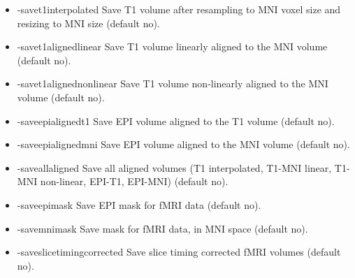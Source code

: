 \begin{itemize}

\item -savet1interpolated        
\newline \newline Save T1 volume after resampling to MNI voxel size and resizing to MNI size (default no). 

\item -savet1alignedlinear       
\newline \newline Save T1 volume linearly aligned to the MNI volume (default no). 

\item -savet1alignednonlinear    
\newline \newline Save T1 volume non-linearly aligned to the MNI volume (default no). 

\item -saveepialignedt1          
\newline \newline Save EPI volume aligned to the T1 volume (default no). 

\item -saveepialignedmni         
\newline \newline Save EPI volume aligned to the MNI volume (default no). 

\item -saveallaligned            
\newline \newline Save all aligned volumes (T1 interpolated, T1-MNI linear, T1-MNI non-linear, EPI-T1, EPI-MNI) (default no). 

\item -saveepimask               
\newline \newline Save EPI mask for fMRI data  (default no). 

\item -savemnimask               
\newline \newline Save mask for fMRI data, in MNI space  (default no). 

\item -saveslicetimingcorrected  
\newline \newline Save slice timing corrected fMRI volumes  (default no). 


\end{itemize}
